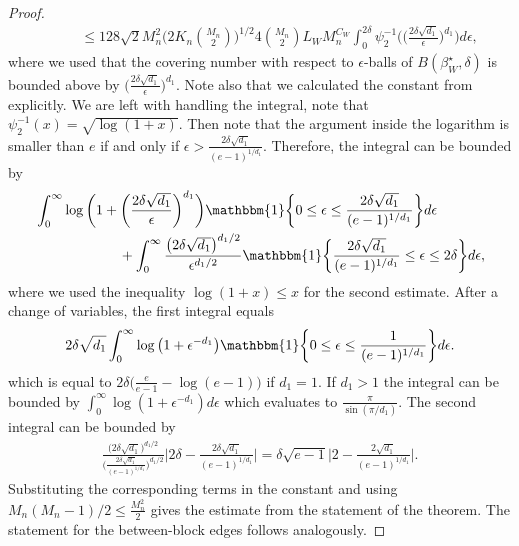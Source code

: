 \documentclass{article}
\begin{document}
\begin{proof}
\begin{align*}
        & \qquad \leq 128 \sqrt{2}  M_n^2 \bigg( 2K_n\binom{M_n}{2} \bigg)^{1/2}  4 \binom{M_n}{2}  L_W M_n^{C_W} \int_0^{2\delta} \psi_2^{-1} \bigg( \bigg( \frac{2\delta\sqrt{d_1}}{\epsilon} \bigg)^{d_1}\bigg) d  \epsilon,
    \end{align*}
    where we used that the covering number with respect to $\epsilon$-balls of $B(\beta_W^{\star},\delta)$ is bounded above by $\Big( \frac{2\delta\sqrt{d_1}}{\epsilon} \Big)^{d_1}$. Note also that we calculated the constant from \cite[Theorem 2.2.4]{vandervaart2023weak} explicitly. We are left with handling the integral, note that $\psi_2^{-1}(x)=\sqrt{ \log(1+x)}$. Then note that the argument inside the logarithm is smaller than $e$ if and only if $ \epsilon > \frac{2\delta \sqrt{d_1}}{(e-1)^{1/d_1}}$. Therefore, the integral can be bounded by
    \begin{align*}
        &\int_0^{\infty} \log \bigg( 1+ \bigg( \frac{2\delta\sqrt{d_1}}{\epsilon} \bigg)^{d_1} \bigg) \mathbbm{1} \bigg\{0 \leq \epsilon \leq \frac{2\delta \sqrt{d_1}}{(e-1)^{1/d_1}}  \bigg \} d \epsilon \\
        & \qquad \qquad \qquad + \int_0^{\infty} \frac{\big(2 \delta \sqrt{d_1} \big)^{d_1/2}}{\epsilon^{d_1/2}} \mathbbm{1} \bigg\{\frac{2\delta \sqrt{d_1}}{(e-1)^{1/d_1}} \leq \epsilon \leq 2\delta  \bigg \} d \epsilon ,
    \end{align*}
    where we used the inequality $\log(1+x) \leq x$ for the second estimate. After a change of variables, the first integral equals
    \begin{align*}
        2\delta\sqrt{d_1} \int_0^{\infty} \log \big( 1+  \epsilon^{-d_1} \big) \mathbbm{1} \bigg\{0 \leq \epsilon \leq \frac{1}{(e-1)^{1/d_1}}  \bigg \} d \epsilon.
    \end{align*}
    which is equal to $ 2\delta \big( \frac{e}{e-1}-\log(e-1) \big) $ if $d_1=1$. If $d_1>1$ the integral can be bounded by $\int_0^{\infty} \log ( 1+  \epsilon^{-d_1} )  d \epsilon$ which evaluates to $\frac{\pi}{\sin(\pi/d_1)}$. The second integral can be bounded by
    \begin{align*}
        \frac{\big(2 \delta \sqrt{d_1} \big)^{d_1/2}}{\Big( \frac{2\delta \sqrt{d_1}}{(e-1)^{1/d_1}} \Big)^{d_1/2}} \bigg\vert 2\delta - \frac{2\delta \sqrt{d_1}}{(e-1)^{1/d_1}}  \bigg\vert = \delta \sqrt{e-1} \bigg\vert 2- \frac{2\sqrt{d_1}}{(e-1)^{1/d_1}} \bigg\vert.
    \end{align*}
    Substituting the corresponding terms in the constant and using $M_n(M_n-1)/2 \leq \frac{M_n^2}{2}$ gives the estimate from the statement of the theorem. The statement for the between-block edges follows analogously.
\end{proof}
\end{document}
